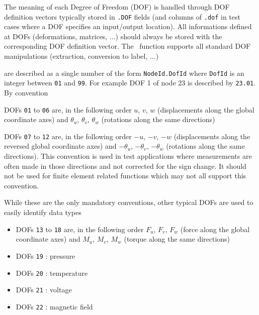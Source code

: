 %

The meaning of each Degree of Freedom (DOF) is handled through DOF definition vectors typically stored in {\tt .DOF} fields (and columns of {\tt .dof} in test cases where a DOF specifies an input/output location). All informations defined at DOFs (deformations, matrices, ...) should always be stored with the corresponding DOF definition vector. The \fec\ function supports all standard DOF manipulations (extraction, conversion to label, ...)

 are described as a single number of the form {\tt NodeId.DofId} where {\tt DofId} is an integer between {\tt 01} and {\tt 99}.  For example DOF 1 of node 23 is described by {\tt 23.01}. By convention

\begin{Eitem}
%
\item DOFs {\tt 01} to {\tt 06} are, in the following order $u$, $v$, $w$ (displacements along the global coordinate axes) and $\theta_{u}$, $\theta_{v}$, $\theta_{w}$ (rotations along the same directions)

\item DOFs {\tt 07} to {\tt 12} are, in the following order $-u$, $-v$, $-w$ (displacements along the reversed global coordinate axes) and $-\theta_{u}$, $-\theta_{v}$, $-\theta_{w}$ (rotations along the same directions). This convention is used in test applications where measurements are often made in those directions and not corrected for the sign change. 
It should not be used for finite element related functions which may not all support this convention.

\end{Eitem}

While these are the only mandatory conventions, other typical DOFs are used to easily identify data types
\begin{itemize}
\item DOFs {\tt 13} to {\tt 18} are, in the following order $F_u$, $F_v$, $F_w$ (force along the global coordinate axes) and $M_{u}$, $M_{v}$, $M_{w}$ (torque along the same directions)
\item DOFs {\tt 19} : pressure
\item DOFs {\tt 20} : temperature
\item DOFs {\tt 21} : voltage
\item DOFs {\tt 22} : magnetic field
\end{itemize}

